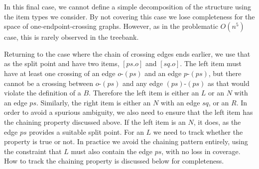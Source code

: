\begin{center}
\end{center}

In this final case, we cannot define a simple decomposition of the structure using the item types we consider.
By not covering this case we lose completeness for the space of one-endpoint-crossing graphs.
However, as in the problematic $O(n^5)$ case, this is rarely observed in the treebank.

Returning to the case where the chain of crossing edges ends earlier, we use that as the split point and have two items, $[ps.o]$ and $[sq.o]$.
The left item must have at least one crossing of an edge $o$-$(ps)$ and an edge $p$-$(ps)$, but there cannot be a crossing between $o$-$(ps)$ and any edge $(ps)$-$(ps)$ as that would violate the definition of a $B$.
Therefore the left item is either an $L$ or an $N$ with an edge $ps$.
Similarly, the right item is either an $N$ with an edge $sq$, or an $R$.
In order to avoid a spurious ambiguity, we also need to ensure that the left item has the chaining property discussed above.
If the left item is an $N$, it does, as the edge $ps$ provides a suitable split point.
For an $L$ we need to track whether the property is true or not.
In practice we avoid the chaining pattern entirely, using the constraint that $L$ must also contain the edge $ps$, with no loss in coverage.
How to track the chaining property is discussed below for completeness.

